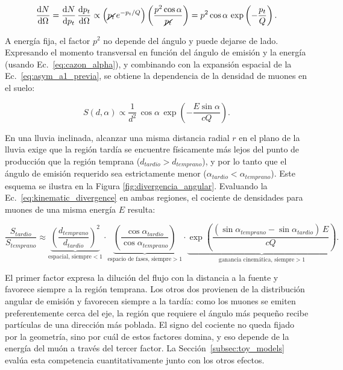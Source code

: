 \begin{equation}
	\frac{\mathrm{d}N}{\mathrm{d}\Omega} = \frac{\mathrm{d}N}{\mathrm{d}p_t}\,\frac{\mathrm{d}p_t}{\mathrm{d}\Omega} \propto \Big(\cancel{p_t}\, e^{-p_t/Q}\Big)\left(\frac{p^2\cos\alpha}{\cancel{p_t}}\right) = p^2 \cos\alpha\, \exp\left(-\frac{p_t}{Q}\right) .
	\label{eq:cazon_dNdOmega}
\end{equation}

A energía fija, el factor $p^2$ no depende del ángulo y puede dejarse de lado. Expresando el momento transversal en función del ángulo de emisión y la energía (usando Ec.~\ref{eq:cazon_alpha}), y combinando con la expansión espacial de la Ec.~\ref{eq:asym_a1_previa}, se obtiene la dependencia de la densidad de muones en el suelo:

\begin{equation}
	S(d, \alpha) \propto \frac{1}{d^2}\,\cos\alpha\,\exp\left(-\frac{E\sin\alpha}{cQ}\right).
	\label{eq:kinematic_divergence}
\end{equation}

En una lluvia inclinada, alcanzar una misma distancia radial $r$ en el plano de la lluvia exige que la región tardía se encuentre físicamente más lejos del punto de producción que la región temprana ($d_{tardio} > d_{temprano}$), y por lo tanto que el ángulo de emisión requerido sea estrictamente menor ($\alpha_{tardio} < \alpha_{temprano}$). Este esquema se ilustra en la Figura \ref{fig:divergencia_angular}. Evaluando la Ec.~\ref{eq:kinematic_divergence} en ambas regiones, el cociente de densidades para muones de una misma energía $E$ resulta:

\begin{equation}
	\frac{S_{tardio}}{S_{temprano}} \approx \underbrace{\left(\frac{d_{temprano}}{d_{tardio}}\right)^2}_{\text{espacial, siempre} < 1} \cdot \underbrace{\left(\frac{\cos\alpha_{tardio}}{\cos\alpha_{temprano}}\right)}_{\text{espacio de fases, siempre} > 1} \cdot \underbrace{\exp\left(\frac{(\sin\alpha_{temprano} - \sin\alpha_{tardio})\,E}{cQ}\right)}_{\text{ganancia cinemática, siempre} > 1}.
	\label{eq:asym_kinematic_ratio}
\end{equation}

El primer factor expresa la dilución del flujo con la distancia a la fuente y favorece siempre a la región temprana. Los otros dos provienen de la distribución angular de emisión y favorecen siempre a la tardía: como los muones se emiten preferentemente cerca del eje, la región que requiere el ángulo más pequeño recibe partículas de una dirección más poblada. El signo del cociente no queda fijado por la geometría, sino por cuál de estos factores domina, y eso depende de la energía del muón a través del tercer factor. La Sección~\ref{subsec:toy_models} evalúa esta competencia cuantitativamente junto con los otros efectos.

